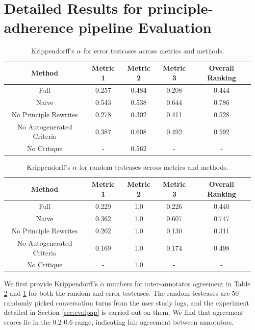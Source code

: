 \documentclass[11pt]{article}
\begin{document}
\section{Detailed Results for principle-adherence pipeline Evaluation}
\label{sec:detres}

\begin{table}[h!]
\small
\centering
\begin{tabular}{|c|c|c|c|c|}
\hline
Method                    & Metric 1 & Metric 2 & Metric 3 & Overall Ranking \\ \hline
Full                      & 0.257  & 0.484    & 0.208       & 0.444           \\ \hline
Naive                     & 0.543   & 0.538    & 0.644       & 0.786           \\ \hline
No Principle Rewrites     & 0.278   & 0.302    & 0.411       & 0.528           \\ \hline
No Autogenerated Criteria & 0.387   & 0.608    & 0.492       & 0.592           \\ \hline
No Critique & -   & 0.562    & -       & -           \\ \hline
\end{tabular}
\caption{Krippendorff's $\alpha$ for error testcases across metrics and methods.}
\label{tab:alpha2}
\end{table}

\begin{table}[h!]
\small
\centering
\begin{tabular}{|c|c|c|c|c|}
\hline
Method                    & Metric 1 & Metric 2 & Metric 3 & Overall Ranking \\ \hline
Full                      & 0.229    & 1.0   & 0.226       & 0.440           \\ \hline
Naive                     & 0.362  & 1.0     & 0.607       & 0.747           \\ \hline
No Principle Rewrites     & 0.202  & 1.0     & 0.130       & 0.311           \\ \hline
No Autogenerated Criteria & 0.169   & 1.0    & 0.174       & 0.498           \\ \hline
No Critique & -   & 1.0    & -       & -           \\ \hline
\end{tabular}
\caption{Krippendorff's $\alpha$ for random testcases across metrics and methods.}
\label{tab:alpha1}
\end{table}

We first provide Krippendorff's $\alpha$ numbers for inter-annotator agreement in Table \ref{tab:alpha1} and \ref{tab:alpha2} for both the random and error testcases. The random testcases are 50 randomly picked conversation turns from the user study logs, and the experiment detailed in Section \ref{sec:evalpap} is carried out on them. We find that agreement scores lie in the 0.2-0.6 range, indicating fair agreement between annotators.
\end{document}
